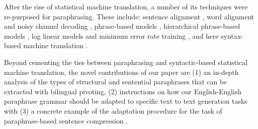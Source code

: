 \documentclass[11pt]{article}
\newcommand{\mnote}[1]{\marginpar{%
  \vskip-\baselineskip
  \raggedright\footnotesize
  \itshape\hrule\smallskip\footnotesize{#1}\par\smallskip\hrule}}
\begin{document}
After the rise of statistical machine translation, a number of its techniques were re-purposed for paraphrasing.  These include: sentence alignment \cite{Gale1993,Barzilay2003a}, word alignment and noisy channel decoding \cite{Brown1990,Quirk2004}, phrase-based models \cite{Koehn2003,Callison-Burch2005}, hierarchical phrase-based models \cite{Chiang2005,Madnani2007}, log linear models and minimum error rate training \cite{Och2003c,Madnani2007,Zhao2008b}, and here syntax-based machine translation \cite{Wu1997,Yamada2001,Melamed2004,Quirk2005}.


Beyond cementing the ties between paraphrasing and syntactic-based statistical machine translation, the novel contributions of our paper are (1) an in-depth analysis of the types of structural and sentential paraphrases that can be extracted with bilingual pivoting, (2) instructions on how our English-English paraphrase grammar should be adapted to specific text to text generation tasks \cite{zhao-EtAl:2009:ACLIJCNLP2} with (3) a concrete example of the adaptation procedure for the task of paraphrase-based sentence compression \cite{KnightMarcuAI02,cohn-lapata:2008,Cohn2009}.






\end{document}
